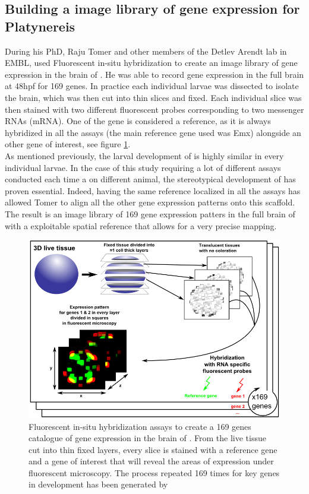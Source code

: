      \subsection{Building a image library of gene expression for Platynereis}
     During his PhD, Raju Tomer and other  members of the Detlev Arendt lab in EMBL, used Fluorescent in-situ hybridization to create an image library of gene expression in the brain of \platy{}. He was able to record gene expression in the full brain at 48hpf for 169 genes. In practice each individual larvae was dissected to isolate the brain, which was then cut into thin slices and fixed. Each individual slice was then stained with two different fluorescent probes corresponding to two messenger RNAs (mRNA). One of the gene is considered a reference, as it is always hybridized in all the assays (the main reference gene used was Emx) alongside an other gene of interest, see figure \ref{fig:insitu}.\\
     
     As mentioned previously, the larval development of \platy{} is highly similar in every individual larvae. In the case of this study requiring a lot of different assays conducted each time a on different animal, the stereotypical development of \platy{} has proven essential. Indeed, having the same reference localized in all the assays has allowed Tomer to align all the other gene expression patterns onto this scaffold. The result is an image library of 169 gene expression patters in the full brain of \platy{} with a exploitable spatial reference that allows for a very precise mapping.\\
    
    \begin{figure}[bth]
\centerline{\includegraphics[width=0.9\linewidth]{gfx/chapter1/insitu.png}}
\caption{Fluorescent in-situ hybridization assays to create a 169 genes catalogue of gene expression in the brain of \platy{}. From the live tissue cut into thin fixed layers, every slice is stained with a reference gene and a gene of interest that will reveal the areas of expression under fluorescent microscopy. The process repeated 169 times for key genes in \platy{} development has been generated by \cite{Tomer10}}\label{fig:insitu}
	\end{figure}
	
